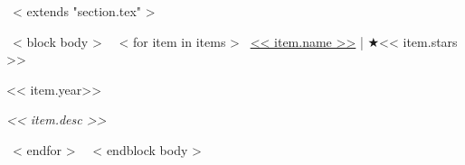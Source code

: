 ~< extends "section.tex" >~

~< block body >~
  \vspace{-0.2mm}
  ~< for item in items >~
    \href{<< item.repo_url >>}{<< item.name >>} | $\bigstar$<< item.stars >> \hfill
    {\small \color{teal} << item.year>>\par }
    {\vspace*{-1mm} \scriptsize \color{gray} \emph{<< item.desc >>} }\par \vspace{1mm}
  ~< endfor >~
\vspace{-4mm}
~< endblock body >~
